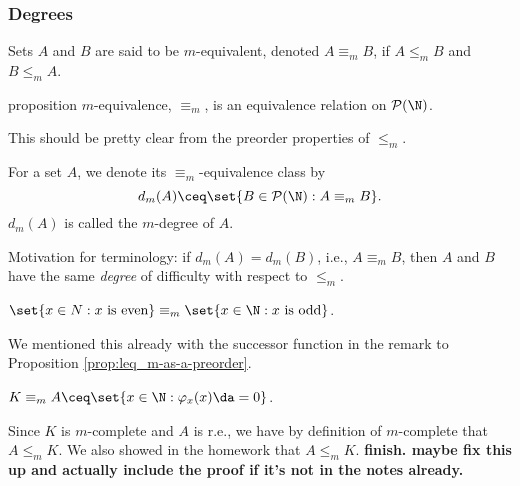 \documentclass[class=article, crop=false]{standalone}
\begin{document}
\subsubsection{Degrees}

\begin{defn}
  Sets $A$ and $B$ are said to be $m$-equivalent, denoted $A \equiv_m B$, if $A \leq_m B$ and $B \leq_m A$.
\end{defn}

\begin{result}{proposition}
  $m$-equivalence, $\equiv_m$, is an equivalence relation on $\mathcal P(\N)$.
\end{result}
\begin{pf}
  This should be pretty clear from the preorder properties of $\leq_m$.
\end{pf}

\begin{defn}
  For a set $A$, we denote its $\equiv_m$-equivalence class by
    \[
      d_m(A) \ceq \set{B \in \mathcal P(\N) : A \equiv_m B}.
    \]
  $d_m(A)$ is called the $m$-degree of $A$.
\end{defn}
\begin{rem}
  Motivation for terminology: if $d_m(A) = d_m(B)$, i.e., $A \equiv_m B$, then $A$ and $B$ have the same \emph{degree} of difficulty with respect to $\leq_m$.
\end{rem}

\begin{ex}
  $\set{x \in N : x \text{ is even}} \equiv_m \set{x \in \N : x \text{ is odd}}$.

  \begin{pf}
    We mentioned this already with the successor function in the remark to Proposition \ref{prop:leq_m-as-a-preorder}.
  \end{pf}
\end{ex}

\begin{ex}
  $K \equiv_m A \ceq \set{x \in \N : \varphi_x(x) \da = 0}$.

  \begin{pf}
    Since $K$ is $m$-complete and $A$ is r.e., we have by definition of $m$-complete that $A \leq_m K$. We also showed in the homework that $A \leq_m K$. \textbf{finish. maybe fix this up and actually include the proof if it's not in the notes already.}
  \end{pf}
\end{ex}
\end{document}

